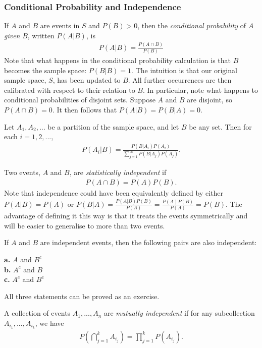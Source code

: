 \subsubsection{Conditional Probability and Independence}

\begin{defn}
    \label{def 1.3.2}
    If $A$ and $B$ are events in $S$ and $P(B) > 0$, then the \textit{conditional probability} of $A$ \textit{given} $B$, written $P(A|B)$, is
    \begin{align*}
        P(A|B) = \frac{P(A \cap B)}{P(B)}
    \end{align*}
    Note that what happens in the conditional probability calculation is that $B$ becomes the sample space: $P(B|B) = 1$. The intuition is that our original sample space, $S$, has been updated to $B$. All further occurrences are then calibrated with respect to their relation to $B$. In particular, note what happens to conditional probabilities of disjoint sets. Suppose $A$ and $B$ are disjoint, so $P(A \cap B) = 0$. It then follows that $P(A|B) = P(B|A) = 0$.
\end{defn}

\begin{thm}
    Let $A_1, A_2, ...$ be a partition of the sample space, and let $B$ be any set. Then for each $i = 1, 2, ...$,
    \begin{align*}
        P(A_i|B) = \frac{P(B|A_i)P(A_i)}{\sum^\infty_{j = 1}P(B|A_j)P(A_j)}.
    \end{align*}
\end{thm}

\begin{defn}
    Two events, $A$ and $B$, are \textit{statistically independent} if
    \begin{align*}
        P(A \cap B) = P(A)P(B).
    \end{align*}
    Note that independence could have been equivalently defined by either $P(A|B) = P(A)$ or $P(B|A) = \frac{P(A|B)P(B)}{P(A)} = \frac{P(A)P(B)}{P(A)} = P(B)$. The advantage of defining it this way is that it treats the events symmetrically and will be easier to generalise to more than two events.
\end{defn}
\begin{thm}
    If $A$ and $B$ are independent events, then the following pairs are also independent:

    \textbf{a.} $A$ and $B^c$ \\
    \textbf{b.} $A^c$ and $B$ \\
    \textbf{c.} $A^c$ and $B^c$
\end{thm}
All three statements can be proved as an exercise.
\begin{defn}
    A collection of events $A_1, ..., A_n$ are \textit{mutually independent} if for any subcollection $A_{i_1}, ..., A_{i_k}$, we have
    \begin{align*}
        P(\bigcap^k_{j = 1} A_{i_j}) = \prod^k_{j = 1} P(A_{i_j}).
    \end{align*}
\end{defn}

